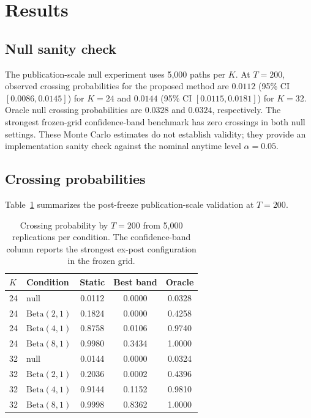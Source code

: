 \section{Results}

\subsection{Null sanity check}

The publication-scale null experiment uses 5,000 paths per \(K\). At \(T=200\), observed crossing probabilities for the proposed method are \(0.0112\) (95\% CI \([0.0086,0.0145]\)) for \(K=24\) and \(0.0144\) (95\% CI \([0.0115,0.0181]\)) for \(K=32\). Oracle null crossing probabilities are \(0.0328\) and \(0.0324\), respectively. The strongest frozen-grid confidence-band benchmark has zero crossings in both null settings. These Monte Carlo estimates do not establish validity; they provide an implementation sanity check against the nominal anytime level \(\alpha=0.05\).

\subsection{Crossing probabilities}

Table~\ref{tab:crossing} summarizes the post-freeze publication-scale validation at \(T=200\).

\begin{table}[ht]
\centering
\caption{Crossing probability by \(T=200\) from 5,000 replications per condition. The confidence-band column reports the strongest ex-post configuration in the frozen grid.}
\label{tab:crossing}
\begin{tabular}{llccc}
\toprule
\(K\) & Condition & Static & Best band & Oracle\\
\midrule
24 & null & 0.0112 & 0.0000 & 0.0328\\
24 & \(\mathrm{Beta}(2,1)\) & 0.1824 & 0.0000 & 0.4258\\
24 & \(\mathrm{Beta}(4,1)\) & 0.8758 & 0.0106 & 0.9740\\
24 & \(\mathrm{Beta}(8,1)\) & 0.9980 & 0.3434 & 1.0000\\
32 & null & 0.0144 & 0.0000 & 0.0324\\
32 & \(\mathrm{Beta}(2,1)\) & 0.2036 & 0.0002 & 0.4396\\
32 & \(\mathrm{Beta}(4,1)\) & 0.9144 & 0.1152 & 0.9810\\
32 & \(\mathrm{Beta}(8,1)\) & 0.9998 & 0.8362 & 1.0000\\
\bottomrule
\end{tabular}
\end{table}

